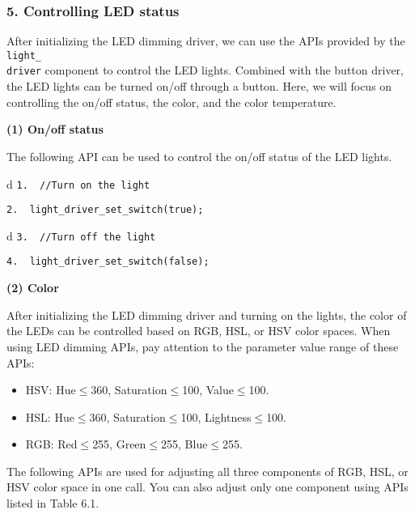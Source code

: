 \documentclass[a4paper,12pt]{book}
\begin{document}
\subsubsection{5. Controlling LED status}
After initializing the LED dimming driver, we can use the APIs provided by the \verb|light_|\\ \verb|driver| component to control the LED lights. Combined with the button driver, the LED lights can be turned on/off through a button. Here, we will focus on controlling the on/off status, the color, and the color temperature.

\textbf{(1)	On/off status}

The following API can be used to control the on/off status of the LED lights.

\begin{codebloc}
\begin{tabular}{d}
\verb|1.  //Turn on the light|

\verb|2.  light_driver_set_switch(true);|
\end{tabular}
\end{codebloc}

\begin{codebloc}
\begin{tabular}{d}
\verb|3.  //Turn off the light|

\verb|4.  light_driver_set_switch(false);|
\end{tabular}
\end{codebloc}

\vspace{2pt}
\textbf{(2)	Color}

After initializing the LED dimming driver and turning on the lights, the color of the LEDs can be controlled based on RGB, HSL, or HSV color spaces. When using LED dimming APIs, pay attention to the parameter value range of these APIs:

\begin{itemize}[noitemsep]
    \item HSV: Hue$\leq$360, Saturation$\leq$100, Value$\leq$100.
    \item HSL: Hue$\leq$360, Saturation$\leq$100, Lightness$\leq$100.
    \item RGB: Red$\leq$255, Green$\leq$255, Blue$\leq$255.
\end{itemize}

The following APIs are used for adjusting all three components of RGB, HSL, or HSV color space in one call. You can also adjust only one component using APIs listed in Table 6.1.
\end{document}
